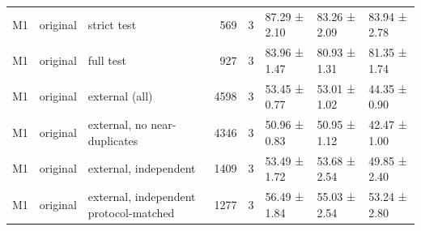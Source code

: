 \begin{tabular}{lllrrlll}
M1 & original & strict test & 569 & 3 & 87.29 ± 2.10 & 83.26 ± 2.09 & 83.94 ± 2.78 \\
M1 & original & full test & 927 & 3 & 83.96 ± 1.47 & 80.93 ± 1.31 & 81.35 ± 1.74 \\
M1 & original & external (all) & 4598 & 3 & 53.45 ± 0.77 & 53.01 ± 1.02 & 44.35 ± 0.90 \\
M1 & original & external, no near-duplicates & 4346 & 3 & 50.96 ± 0.83 & 50.95 ± 1.12 & 42.47 ± 1.00 \\
M1 & original & external, independent & 1409 & 3 & 53.49 ± 1.72 & 53.68 ± 2.54 & 49.85 ± 2.40 \\
M1 & original & external, independent protocol-matched & 1277 & 3 & 56.49 ± 1.84 & 55.03 ± 2.54 & 53.24 ± 2.80 \\
\bottomrule
\end{tabular}
